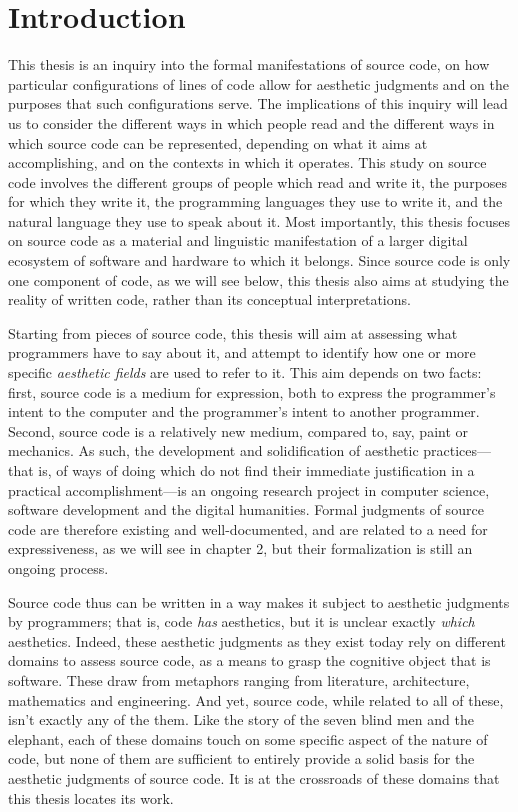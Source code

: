 \section{Introduction}

This thesis is an inquiry into the formal manifestations of source code, on how particular configurations of lines of code allow for aesthetic judgments and on the purposes that such configurations serve. The implications of this inquiry will lead us to consider the different ways in which people read and the different ways in which source code can be represented, depending on what it aims at accomplishing, and on the contexts in which it operates.
This study on source code involves the different groups of people which read and write it, the purposes for which they write it, the programming languages they use to write it, and the natural language they use to speak about it. Most importantly, this thesis focuses on source code as a material and linguistic manifestation of a larger digital ecosystem of software and hardware to which it belongs. Since source code is only one component of code, as we will see below, this thesis also aims at studying the reality of written code, rather than its conceptual interpretations.

Starting from pieces of source code, this thesis will aim at assessing what programmers have to say about it, and attempt to identify how one or more specific \emph{aesthetic fields} are used to refer to it. This aim depends on two facts: first, source code is a medium for expression, both to express the programmer's intent to the computer\cite{dijkstra_craftsman_1982} and the programmer's intent to another programmer\cite{abelson_structure_1979}. Second, source code is a relatively new medium, compared to, say, paint or mechanics. As such, the development and solidification of aesthetic practices—that is, of ways of doing which do not find their immediate justification in a practical accomplishment—is an ongoing research project in computer science, software development and the digital humanities. Formal judgments of source code are therefore existing and well-documented, and are related to a need for expressiveness, as we will see in chapter 2, but their formalization is still an ongoing process.

Source code thus can be written in a way makes it subject to aesthetic judgments by programmers; that is, code \emph{has} aesthetics, but it is unclear exactly \emph{which} aesthetics. Indeed, these aesthetic judgments as they exist today rely on different domains to assess source code, as a means to grasp the cognitive object that is software. These draw from metaphors ranging from literature, architecture, mathematics and engineering. And yet, source code, while related to all of these, isn't exactly any of the them. Like the story of the seven blind men and the elephant\cite{chun_sourcery_2008}, each of these domains touch on some specific aspect of the nature of code, but none of them are sufficient to entirely provide a solid basis for the aesthetic judgments of source code. It is at the crossroads of these domains that this thesis locates its work.

